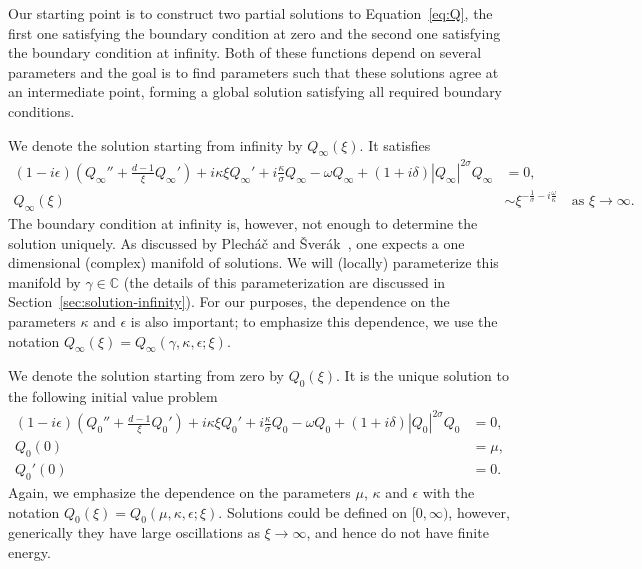 \documentclass[11pt]{article}
\begin{document}
Our starting point is to construct two partial solutions to
Equation~\eqref{eq:Q}, the first one satisfying the boundary condition
at zero and the second one satisfying the boundary condition at
infinity. Both of these functions depend on several parameters and
the goal is to find parameters such that these solutions agree at an
intermediate point, forming a global solution satisfying all required
boundary conditions.

We denote the solution starting from infinity by \(Q_{\infty}(\xi)\). It satisfies
\begin{equation}
  \label{eq:problem-infinity}
  \begin{split}
    (1 - i\epsilon)\left(Q_{\infty}'' + \frac{d - 1}{\xi}Q_{\infty}'\right) + i\kappa\xi Q_{\infty}'
    + i \frac{\kappa}{\sigma}Q_{\infty} - \omega Q_{\infty} + (1 + i\delta)|Q_{\infty}|^{2\sigma}Q_{\infty} &= 0,\\
    Q_{\infty}(\xi) &\sim \xi^{-\frac{1}{\sigma} - i\frac{\omega}{\kappa}} \quad\text{as } \xi \to \infty.
  \end{split}
\end{equation}
The boundary condition at infinity is, however, not enough to
determine the solution uniquely. As discussed by Plecháč and
Šverák~\cite{Plech2001}, one expects a one dimensional (complex)
manifold of solutions. We will (locally) parameterize this manifold by
\(\gamma \in \mathbb{C}\) (the details of this parameterization are
discussed in Section~\ref{sec:solution-infinity}). For our purposes,
the dependence on the parameters \(\kappa\) and \(\epsilon\) is also
important; to emphasize this dependence, we use the notation
\(Q_{\infty}(\xi) = Q_{\infty}(\gamma, \kappa, \epsilon; \xi)\).

We denote the solution starting from zero by \(Q_{0}(\xi)\). It is the
unique solution to the following initial value problem
\begin{equation}
  \label{eq:problem-zero}
  \begin{split}
    (1 - i\epsilon)\left(Q_{0}'' + \frac{d - 1}{\xi}Q_{0}'\right) + i\kappa\xi Q_{0}'
    + i \frac{\kappa}{\sigma}Q_{0} - \omega Q_{0} + (1 + i\delta)|Q_{0}|^{2\sigma}Q_{0} &= 0,\\
    Q_{0}(0) &= \mu,\\
    Q_{0}'(0) &= 0.
  \end{split}
\end{equation}
Again, we emphasize the dependence on the parameters \(\mu\),
\(\kappa\) and \(\epsilon\) with the notation
\(Q_{0}(\xi) = Q_{0}(\mu, \kappa, \epsilon; \xi)\). Solutions could be
defined on \([0, \infty)\), however, generically they have large
oscillations as \(\xi \to \infty\), and hence do not have finite
energy.
\end{document}
